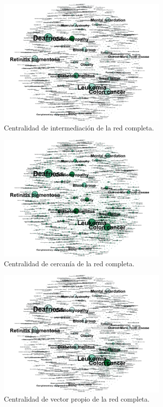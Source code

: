\documentclass{uimppracticas}
\begin{document}
\begin{figure}[H]
	\centering
	\includegraphics[width=0.75\textwidth]{images/Betweenness-Centrality}
	\caption{Centralidad de intermediación de la red completa.}
	\label{Betweenness-Centrality}
\end{figure}

\begin{figure}[H]
	\centering
	\includegraphics[width=0.75\textwidth]{images/Closeness-Centrality}
	\caption{Centralidad de cercanía de la red completa.}
	\label{Closeness-Centrality}
\end{figure}

\begin{figure}[H]
	\centering
	\includegraphics[width=0.75\textwidth]{images/Eigenvector-Centrality-Graph}
	\caption{Centralidad de vector propio de la red completa.}
	\label{Eigenvector-Centrality-Graph}
\end{figure}
\end{document}
